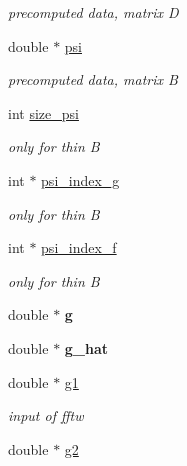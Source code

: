 \begin{CompactItemize}
\begin{CompactList}\small\item\em precomputed data, matrix D \item\end{CompactList}\item 
\hypertarget{structnfct__plan_o18}{
double $\ast$ \hyperlink{structnfct__plan_o18}{psi}}
\label{structnfct__plan_o18}

\begin{CompactList}\small\item\em precomputed data, matrix B \item\end{CompactList}\item 
\hypertarget{structnfct__plan_o19}{
int \hyperlink{structnfct__plan_o19}{size\_\-psi}}
\label{structnfct__plan_o19}

\begin{CompactList}\small\item\em only for thin B \item\end{CompactList}\item 
\hypertarget{structnfct__plan_o20}{
int $\ast$ \hyperlink{structnfct__plan_o20}{psi\_\-index\_\-g}}
\label{structnfct__plan_o20}

\begin{CompactList}\small\item\em only for thin B \item\end{CompactList}\item 
\hypertarget{structnfct__plan_o21}{
int $\ast$ \hyperlink{structnfct__plan_o21}{psi\_\-index\_\-f}}
\label{structnfct__plan_o21}

\begin{CompactList}\small\item\em only for thin B \item\end{CompactList}\item 
\hypertarget{structnfct__plan_o22}{
double $\ast$ {\bf g}}
\label{structnfct__plan_o22}

\item 
\hypertarget{structnfct__plan_o23}{
double $\ast$ {\bf g\_\-hat}}
\label{structnfct__plan_o23}

\item 
\hypertarget{structnfct__plan_o24}{
double $\ast$ \hyperlink{structnfct__plan_o24}{g1}}
\label{structnfct__plan_o24}

\begin{CompactList}\small\item\em input of fftw \item\end{CompactList}\item 
\hypertarget{structnfct__plan_o25}{
double $\ast$ \hyperlink{structnfct__plan_o25}{g2}}
\label{structnfct__plan_o25}


\end{CompactItemize}
